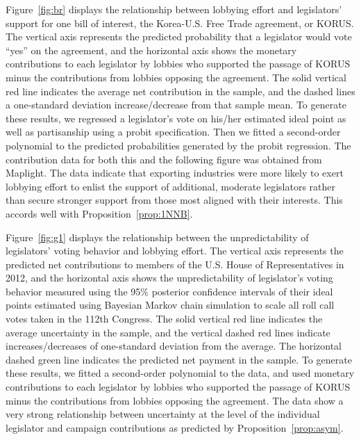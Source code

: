 \documentclass[12pt]{article}
\begin{document}
Figure~\ref{fig:br} displays the relationship between lobbying effort and legislators' support for one bill of interest, the Korea-U.S. Free Trade agreement, or KORUS. The vertical axis represents the predicted probability that a legislator would vote ``yes'' on the agreement, and the horizontal axis shows the monetary contributions to each legislator by lobbies who supported the passage of KORUS minus the contributions from lobbies opposing the agreement. The solid vertical red line indicates the average net contribution in the sample, and the dashed lines a one-standard deviation increase/decrease from that sample mean. To generate these results,  we regressed a legislator's vote on his/her estimated ideal point as well as partisanship using a probit specification. Then we fitted a second-order polynomial to the predicted probabilities generated by the probit regression. The contribution data for both this and the following figure was obtained from Maplight. The data indicate that exporting industries were more likely to exert lobbying effort to enlist the support of additional, moderate legislators rather than secure stronger support from those most aligned with their interests. This accords well with Proposition~\ref{prop:1NNB}.

Figure~\ref{fig:g1} displays the relationship between the unpredictability of legislators' voting behavior and lobbying effort. The vertical axis represents the predicted net contributions to members of the U.S. House of Representatives in 2012, and the horizontal axis shows the unpredictability of legislator's voting behavior measured using the 95$\%$ posterior confidence intervals of their ideal points estimated using Bayesian Markov chain simulation to scale all roll call votes taken in the 112th Congress. The solid vertical red line indicates the average uncertainty in the sample, and the vertical dashed red lines indicate increases/decreases of one-standard deviation from the average. The horizontal dashed green line indicates the predicted net payment in the sample. To generate these results, we fitted a second-order polynomial to the data, and used monetary contributions to each legislator by lobbies who supported the passage of KORUS minus the contributions from lobbies opposing the agreement. The data show a very strong relationship between uncertainty at the level of the individual legislator and campaign contributions as predicted by Proposition~\ref{prop:asym}.
\end{document}
